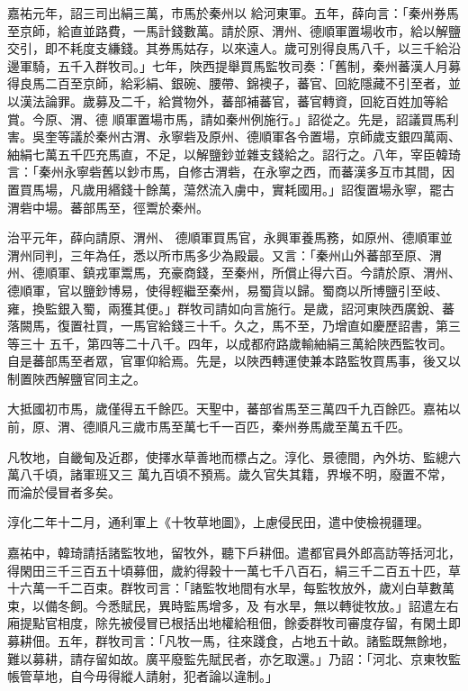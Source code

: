 \begin{pinyinscope}
 嘉祐元年，詔三司出絹三萬，市馬於秦州以
 給河東軍。五年，薛向言：「秦州券馬至京師，給直並路費，一馬計錢數萬。請於原、渭州、德順軍置場收市，給以解鹽交引，即不耗度支縑錢。其券馬姑存，以來遠人。歲可別得良馬八千，以三千給沿邊軍騎，五千入群牧司。」七年，陜西提舉買馬監牧司奏：「舊制，秦州蕃漢人月募得良馬二百至京師，給彩絹、銀碗、腰帶、錦襖子，蕃官、回紇隱藏不引至者，並以漢法論罪。歲募及二千，給賞物外，蕃部補蕃官，蕃官轉資，回紇百姓加等給賞。今原、渭、德
 順軍置場市馬，請如秦州例施行。」詔從之。先是，詔議買馬利害。吳奎等議於秦州古渭、永寧砦及原州、德順軍各令置場，京師歲支銀四萬兩、紬絹七萬五千匹充馬直，不足，以解鹽鈔並雜支錢給之。詔行之。八年，宰臣韓琦言：「秦州永寧砦舊以鈔市馬，自修古渭砦，在永寧之西，而蕃漢多互市其間，因置買馬場，凡歲用緡錢十餘萬，蕩然流入虜中，實耗國用。」詔復置場永寧，罷古渭砦中場。蕃部馬至，徑鬻於秦州。



 治平元年，薛向請原、渭州、
 德順軍買馬官，永興軍養馬務，如原州、德順軍並渭州同判，三年為任，悉以所市馬多少為殿最。又言：「秦州山外蕃部至原、渭州、德順軍、鎮戎軍鬻馬，充豪商錢，至秦州，所償止得六百。今請於原、渭州、德順軍，官以鹽鈔博易，使得輕繼至秦州，易蜀貨以歸。蜀商以所博鹽引至岐、雍，換監銀入蜀，兩獲其便。」群牧司請如向言施行。是歲，詔河東陜西廣銳、蕃落闕馬，復置社買，一馬官給錢三十千。久之，馬不至，乃增直如慶歷詔書，第三等三十
 五千，第四等二十八千。四年，以成都府路歲輸紬絹三萬給陜西監牧司。自是蕃部馬至者眾，官軍仰給焉。先是，以陜西轉運使兼本路監牧買馬事，後又以制置陜西解鹽官同主之。



 大抵國初市馬，歲僅得五千餘匹。天聖中，蕃部省馬至三萬四千九百餘匹。嘉祐以前，原、渭、德順凡三歲市馬至萬七千一百匹，秦州券馬歲至萬五千匹。



 凡牧地，自畿甸及近郡，使擇水草善地而標占之。淳化、景德間，內外坊、監總六萬八千頃，諸軍班又三
 萬九百頃不預焉。歲久官失其籍，界堠不明，廢置不常，而淪於侵冒者多矣。



 淳化二年十二月，通利軍上《十牧草地圖》，上慮侵民田，遣中使檢視疆理。



 嘉祐中，韓琦請括諸監牧地，留牧外，聽下戶耕佃。遣都官員外郎高訪等括河北，得閑田三千三百五十頃募佃，歲約得穀十一萬七千八百石，絹三千二百五十匹，草十六萬一千二百束。群牧司言：「諸監牧地間有水旱，每監牧放外，歲刈白草數萬束，以備冬飼。今悉賦民，異時監馬增多，及
 有水旱，無以轉徙牧放。」詔遣左右廂提點官相度，除先被侵冒已根括出地權給租佃，餘委群牧司審度存留，有閑土即募耕佃。五年，群牧司言：「凡牧一馬，往來踐食，占地五十畝。諸監既無餘地，難以募耕，請存留如故。廣平廢監先賦民者，亦乞取還。」乃詔：「河北、京東牧監帳管草地，自今毋得縱人請射，犯者論以違制。」




\end{pinyinscope}
